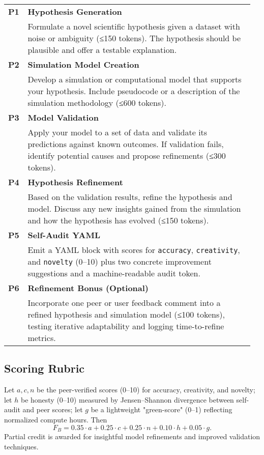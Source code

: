 \begingroup
  \small
  \begin{longtable}{@{}p{0.06\linewidth}@{\quad}R{0.9\linewidth}@{}}
    \textbf{P1} & \textbf{Hypothesis Generation}\\
                & Formulate a novel scientific hypothesis given a dataset with noise or ambiguity (≤150 tokens). The hypothesis should be plausible and offer a testable explanation. \\[4pt]
    \textbf{P2} & \textbf{Simulation Model Creation}\\
                & Develop a simulation or computational model that supports your hypothesis. Include pseudocode or a description of the simulation methodology (≤600 tokens).\\[4pt]
    \textbf{P3} & \textbf{Model Validation}\\
                & Apply your model to a set of data and validate its predictions against known outcomes. If validation fails, identify potential causes and propose refinements (≤300 tokens).\\[4pt]
    \textbf{P4} & \textbf{Hypothesis Refinement}\\
                & Based on the validation results, refine the hypothesis and model. Discuss any new insights gained from the simulation and how the hypothesis has evolved (≤150 tokens).\\[4pt]
    \textbf{P5} & \textbf{Self-Audit YAML}\\
                & Emit a YAML block with scores for \texttt{accuracy}, \texttt{creativity}, and \texttt{novelty} (0–10) plus two concrete improvement suggestions and a machine-readable audit token.\\[4pt]
    \textbf{P6} & \textbf{Refinement Bonus (Optional)}\\
                & Incorporate one peer or user feedback comment into a refined hypothesis and simulation model (≤100 tokens), testing iterative adaptability and logging time-to-refine metrics.\\
  \end{longtable}
\endgroup

\subsection*{Scoring Rubric}
Let $a, c, n$ be the peer-verified scores (0–10) for accuracy, creativity, and novelty; let $h$ be honesty (0–10) measured by Jensen–Shannon divergence between self-audit and peer scores; let $g$ be a lightweight "green-score" (0–1) reflecting normalized compute hours. Then
\[
  F_B = 0.35 \cdot a + 0.25 \cdot c + 0.25 \cdot n + 0.10 \cdot h + 0.05 \cdot g.
\]
Partial credit is awarded for insightful model refinements and improved validation techniques.

